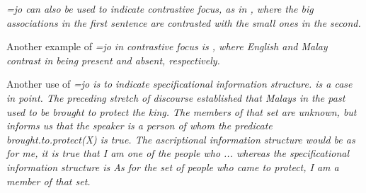 
  
\em =jo \em can also be used to indicate contrastive focus, as in , where the big associations in the first sentence are contrasted with the small ones in the second.


Another example of \em =jo \em in contrastive focus is , where English and Malay contrast in being present and absent, respectively.


Another use of \em =jo \em is to indicate specificational information structure.  is a case in point. The preceding stretch of discourse established that Malays in the past used to be brought to protect the king. The members of that set are unknown, but  informs us that the speaker is a person of whom the predicate brought.to.protect(X) is true. The ascriptional information structure would be \em as for me, it is true that I am one of the people who ... \em whereas the specificational information structure is \em As for the set of people who came to protect, I am a member of that set.\em




